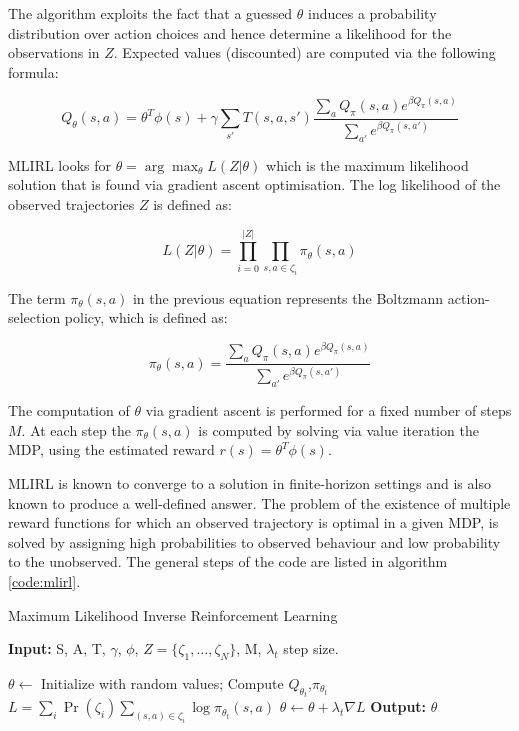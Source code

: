 The algorithm exploits the fact that a guessed $\theta$ induces a probability distribution over action choices and hence determine a likelihood for the observations in $Z$. Expected values (discounted) are computed via the following formula:

$$Q_\theta(s,a) = \theta^T\phi(s)+\gamma\sum_{s'}T(s,a,s')\frac{\sum_a Q_\pi(s,a)e^{\beta Q_\pi(s,a)}}{\sum_{a'}e^{\beta Q_\pi(s,a')} }$$

MLIRL looks for $\theta = \arg\max_\theta L(Z|\theta)$ which is the maximum likelihood solution that is found via gradient ascent optimisation. 
The log likelihood of the observed trajectories $Z$ is defined as:

	$$L(Z|\theta) = \prod_{i=0}^{|Z|} \prod_{s,a \in \zeta_i} \pi_\theta(s,a)$$

The term $\pi_\theta(s,a)$ in the previous equation represents the Boltzmann action-selection policy, which is defined as:

$$\pi_\theta(s,a) = \frac{\sum_a Q_\pi(s,a)e^{\beta Q_\pi(s,a)}}{\sum_{a'}e^{\beta Q_\pi(s,a')}}$$

The computation of $\theta$ via gradient ascent is performed for a fixed number of steps $M$. At each step the $\pi_\theta(s,a)$ is computed by solving via value iteration the MDP, using the estimated reward $r(s) = \theta^T \phi(s)$.

MLIRL is known to converge to a solution in finite-horizon settings and is also known to produce a well-defined answer. The problem of the existence of multiple reward functions for which an observed trajectory is optimal in a given MDP, is solved by assigning high probabilities to observed behaviour and low probability to the unobserved. The general steps of the code are listed in algorithm \ref{code:mlirl}.

\begin{algorithm}
	\caption{Maximum Likelihood Inverse Reinforcement Learning}
	\label{code:mlirl}
	\begin{algorithmic}
		\State \textbf{Input:} S, A, T, $\gamma$, $\phi$, $Z=\lbrace \zeta_1, \dots,  \zeta_N \rbrace$, M, $\lambda_t$ step size.
		
		\State $\theta \leftarrow$ Initialize with random values;
		\State Compute $Q_{\theta_t}$,$\pi_{\theta_t}$
		\State $L = \sum_{i} \Pr{(\zeta_i)} \sum_{(s,a) \in \zeta_i} \log{\pi_{\theta_t}(s,a)}$
		\State $\theta \leftarrow \theta + \lambda_t\nabla{L}$
		\EndFor
		\State \textbf{Output:}  $\theta$
	\end{algorithmic}
\end{algorithm}

